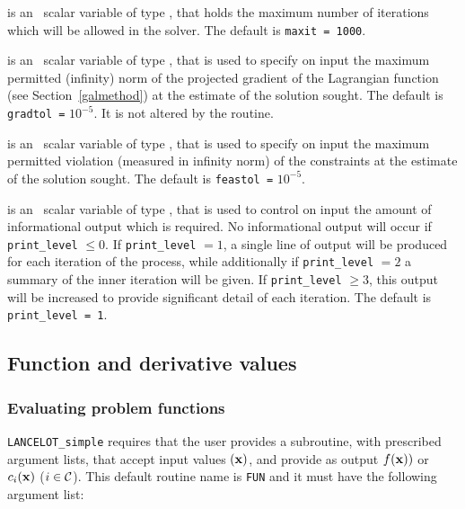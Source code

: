 \documentclass{galahad}
\newcommand{\calC}{{\cal C}}
\begin{document}
\begin{description}
 is an \optional\ scalar variable of type \integer, that
holds the maximum number of iterations which will be allowed in the solver.
The default is {\tt maxit = 1000}.

 is an \optional\ scalar variable of type \realdp,
that is used to specify on input the maximum permitted (infinity)
norm of the projected gradient of the Lagrangian function
(see Section~\ref{galmethod}) at the estimate of the solution sought.
The default is {\tt gradtol =} $10^{-5}$.  It is not altered by the routine.

 is an \optional\ scalar variable of type \realdp,
that is used to specify on input the maximum permitted violation (measured in
infinity norm) of the constraints at the estimate of the solution sought.
The default is {\tt feastol =} $10^{-5}$.

 is an \optional\ scalar variable of type \integer,
that is used to control on input the amount of informational output which is
required. No informational output will occur if {\tt print\_level} $\leq 0$. If
{\tt print\_level} $= 1$, a single line of output will be produced for each
iteration of the process, while additionally if {\tt print\_level} $= 2$
a summary of the inner iteration will be given.
If {\tt print\_level} $\geq 3$, this output will be
increased to provide significant detail of each iteration.
The default is {\tt print\_level = 1}.
\end{description}

\subsection{Function and derivative values\label{fdv}}


\subsubsection{Evaluating problem functions\label{pfe}}

{\tt LANCELOT\_simple} requires that the user provides a
subroutine, with prescribed argument lists, that accept input
values $({\mathbf{x}})$, and provide as output
$f({\mathbf{x}}))$ or $c_i({\mathbf{x}})$ ($i \in \calC$).
This default routine name is {\tt FUN} and it must have the following argument
list:
\end{document}
